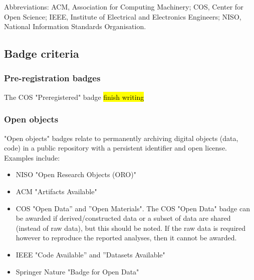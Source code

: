 \vspace*{-1.5\baselineskip}
\footnotesize Abbreviations: ACM, Association for Computing Machinery; COS, Center for Open Science; IEEE, Institute of Electrical and Electronics Engineers; NISO, National Information Standards Organisation.
\normalsize 
\\

\subsection{Badge criteria}

\subsubsection{Pre-registration badges}

The COS "Preregistered" badge \hl{finish writing}

\subsubsection{Open objects}

"Open objects" badges relate to permanently archiving digital objects (data, code) in a public repository with a persistent identifier and open license.\autocite{niso_reproducibility_badging_and_definitions_working_group_reproducibility_2021} Examples include:
\begin{itemize}
    \item NISO "Open Research Objects (ORO)"\autocite{niso_reproducibility_badging_and_definitions_working_group_reproducibility_2021}
    \item ACM "Artifacts Available"\autocite{association_for_computing_machinery_acm_artifact_2020}
    \item COS "Open Data” and ”Open Materials". The COS "Open Data" badge can be awarded if derived/constructed data or a subset of data are shared (instead of raw data), but this should be noted. If the raw data is required however to reproduce the reported analyses, then it cannot be awarded.\autocite{blohowiak_badges_2023}
    \item IEEE "Code Available” and ”Datasets Available"\autocite{institute_of_electrical_and_electronics_engineers_ieee_about_nodate}
    \item Springer Nature "Badge for Open Data"\autocite{springer_nature_springer_2018}
\end{itemize}

